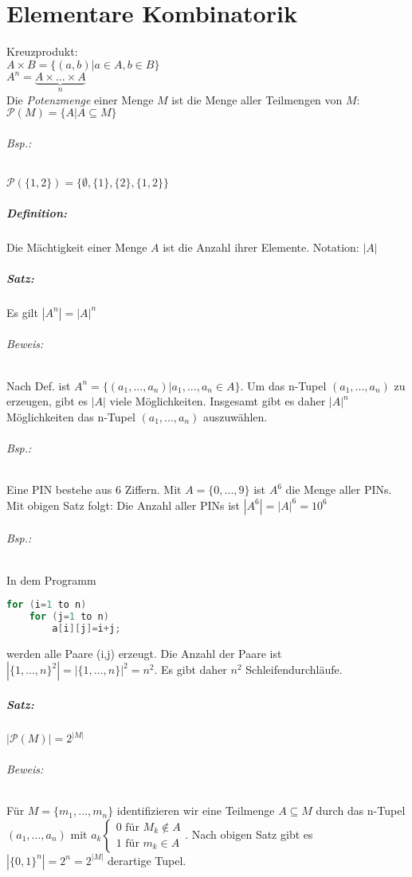 \chapter{Elementare Kombinatorik}

Kreuzprodukt:\\
$A\times B = \{(a,b)|a \in A, b \in B\}$\\
$A^n=\underbrace{A\times ... \times A}_{n}$\\
Die \emph{Potenzmenge} einer Menge $M$ ist die Menge aller Teilmengen von $M$:
$\mathcal{P}(M)=\{A|A\subseteq M\}$
\subparagraph{Bsp.:} $\mathcal{P}(\{1,2\})=\{\emptyset, \{1\}, \{2\}, \{1,2\}\}$

\paragraph{Definition:} Die Mächtigkeit einer Menge $A$ ist die Anzahl ihrer Elemente. Notation: $|A|$

\paragraph{Satz:} Es gilt $|A^n|=|A|^n$
\subparagraph{Beweis:} 
Nach Def. ist $A^n=\{(a_1,...,a_n)|a_1,...,a_n \in A\}$. Um das n-Tupel $(a_1,...,a_n)$ zu erzeugen, gibt es $|A|$ viele Möglichkeiten. Insgesamt gibt es daher $|A|^n$ Möglichkeiten das n-Tupel $(a_1,...,a_n)$ auszuwählen.

\subparagraph{Bsp.:} Eine PIN bestehe aus 6 Ziffern. Mit $A=\{0,...,9\}$ ist $A^6$ die Menge aller PINs. Mit obigen Satz folgt: Die Anzahl aller PINs ist $|A^6|=|A|^6 = 10^6$

\subparagraph{Bsp.:} In dem Programm
\begin{lstlisting}[language=C]
for (i=1 to n)
	for (j=1 to n)
		a[i][j]=i+j;
\end{lstlisting}
werden alle Paare (i,j) erzeugt. Die Anzahl der Paare ist $|\{1,...,n\}^2|=|\{1,...,n\}|^2=n^2$. Es gibt daher $n^2$ Schleifendurchläufe.

\paragraph{Satz:} $|\mathcal{P}(M)|=2^{|M|}$
\subparagraph{Beweis:} Für $M=\{m_1, ...,m_n\}$ identifizieren wir eine Teilmenge $A\subseteq M$ durch das n-Tupel $(a_1, ..., a_n)$ mit $a_k\begin{cases}0\text{ für }M_k \not \in A\\ 1\text{ für }m_k \in A\end{cases}$. Nach obigen Satz gibt es $|\{0,1\}^n|=2^n=2^{|M|}$ derartige Tupel.

